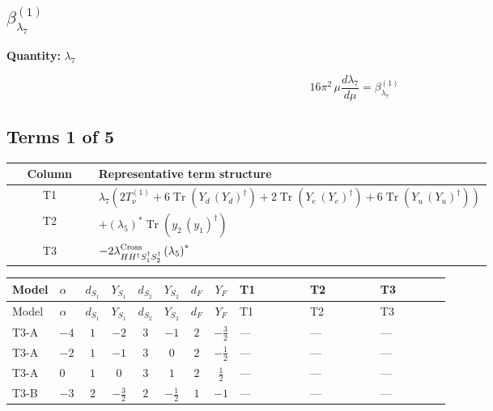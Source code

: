 \documentclass[8pt]{article}
\begin{document}
\begin{landscape}
\section*{$\beta_{\lambda_{7}}^{(1)}$}
\noindent\textbf{Quantity: }$\lambda_{7}$\par\smallskip
\[16\pi^2\,\mu\frac{d \lambda_{7}}{d\mu}=\beta_{\lambda_{7}}^{(1)}\]
\subsection*{Terms 1 of 5}
\begin{center}
\begin{tabular}{@{}c >{\raggedright\arraybackslash}p{0.82\linewidth}@{}}
\toprule
Column & Representative term structure \\
\midrule
T1 & \(\displaystyle {\lambda_{7}} (2 T_{\nu}^{(1)}+6 \operatorname{Tr}\!\left({Y_d}\,\left({Y_d}\right)^{\dagger}\right)+2 \operatorname{Tr}\!\left({Y_e}\,\left({Y_e}\right)^{\dagger}\right)+6 \operatorname{Tr}\!\left({Y_u}\,\left({Y_u}\right)^{\dagger}\right))\) \\
\midrule
T2 & \(\displaystyle +\left({\lambda_5}\right)^{*} \operatorname{Tr}\!\left({y_2}\,\left({y_1}\right)^{\dagger}\right)\) \\
\midrule
T3 & \(\displaystyle -2 {\lambda_{H H^\dagger S_1^\dagger S_2^\dagger}^{\rm Cross}} \left({\lambda_5}\right)^{*}\) \\
\midrule
\bottomrule
\end{tabular}
\end{center}
\smallskip
\tiny
\begin{longtable}{@{}llcccccc >{\raggedright\arraybackslash}p{0.21\linewidth} >{\raggedright\arraybackslash}p{0.21\linewidth} >{\raggedright\arraybackslash}p{0.21\linewidth}@{}}
\toprule
Model & $\alpha$ & $d_{S_1}$ & $Y_{S_1}$ & $d_{S_2}$ & $Y_{S_2}$ & $d_F$ & $Y_F$ & T1 & T2 & T3 \\
\midrule
\endfirsthead
\toprule
Model & $\alpha$ & $d_{S_1}$ & $Y_{S_1}$ & $d_{S_2}$ & $Y_{S_2}$ & $d_F$ & $Y_F$ & T1 & T2 & T3 \\
\midrule
\endhead
T3-A & $-4$ & $1$ & $-2$ & $3$ & $-1$ & $2$ & $-\frac{3}{2}$ & --- & --- & --- \\
\midrule
T3-A & $-2$ & $1$ & $-1$ & $3$ & $0$ & $2$ & $-\frac{1}{2}$ & --- & --- & --- \\
\midrule
T3-A & $0$ & $1$ & $0$ & $3$ & $1$ & $2$ & $\frac{1}{2}$ & --- & --- & --- \\
\midrule
T3-B & $-3$ & $2$ & $-\frac{3}{2}$ & $2$ & $-\frac{1}{2}$ & $1$ & $-1$ & --- & --- & --- \\

\end{longtable}
\end{landscape}
\end{document}

